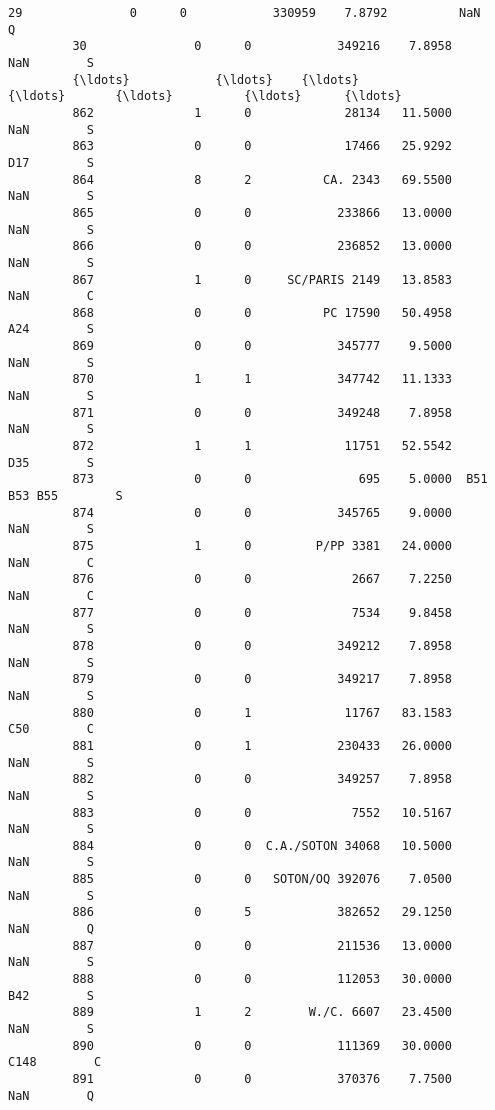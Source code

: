 \documentclass[11pt]{article}
\begin{document}
\begin{Verbatim}[commandchars=\\\{\}]
         29               0      0            330959    7.8792          NaN        Q   
         30               0      0            349216    7.8958          NaN        S   
         {\ldots}            {\ldots}    {\ldots}               {\ldots}       {\ldots}          {\ldots}      {\ldots}   
         862              1      0             28134   11.5000          NaN        S   
         863              0      0             17466   25.9292          D17        S   
         864              8      2          CA. 2343   69.5500          NaN        S   
         865              0      0            233866   13.0000          NaN        S   
         866              0      0            236852   13.0000          NaN        S   
         867              1      0     SC/PARIS 2149   13.8583          NaN        C   
         868              0      0          PC 17590   50.4958          A24        S   
         869              0      0            345777    9.5000          NaN        S   
         870              1      1            347742   11.1333          NaN        S   
         871              0      0            349248    7.8958          NaN        S   
         872              1      1             11751   52.5542          D35        S   
         873              0      0               695    5.0000  B51 B53 B55        S   
         874              0      0            345765    9.0000          NaN        S   
         875              1      0         P/PP 3381   24.0000          NaN        C   
         876              0      0              2667    7.2250          NaN        C   
         877              0      0              7534    9.8458          NaN        S   
         878              0      0            349212    7.8958          NaN        S   
         879              0      0            349217    7.8958          NaN        S   
         880              0      1             11767   83.1583          C50        C   
         881              0      1            230433   26.0000          NaN        S   
         882              0      0            349257    7.8958          NaN        S   
         883              0      0              7552   10.5167          NaN        S   
         884              0      0  C.A./SOTON 34068   10.5000          NaN        S   
         885              0      0   SOTON/OQ 392076    7.0500          NaN        S   
         886              0      5            382652   29.1250          NaN        Q   
         887              0      0            211536   13.0000          NaN        S   
         888              0      0            112053   30.0000          B42        S   
         889              1      2        W./C. 6607   23.4500          NaN        S   
         890              0      0            111369   30.0000         C148        C   
         891              0      0            370376    7.7500          NaN        Q   
         

\end{Verbatim}
\end{document}
